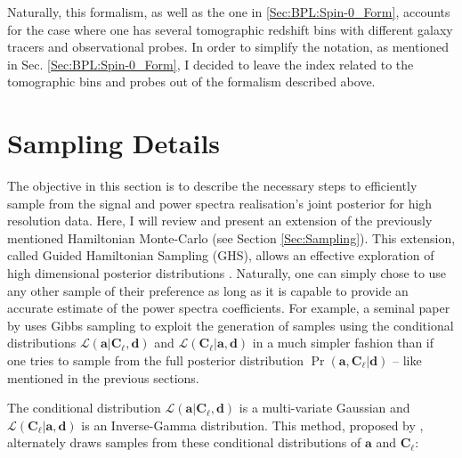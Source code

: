 \qquad Naturally, this formalism, as well as the one in \ref{Sec:BPL:Spin-0_Form}, accounts for the case where one has several tomographic redshift bins with different galaxy tracers and observational probes. In order to simplify the notation, as mentioned in Sec. \ref{Sec:BPL:Spin-0_Form}, I decided to leave the index related to the tomographic bins and probes out of the formalism described above.

\section{Sampling Details}\label{Sec:BPL:Sampling}
The objective in this section is to describe the necessary steps to efficiently sample from the signal and power spectra realisation's joint posterior for high resolution data. Here, I will review and present an extension of the previously mentioned Hamiltonian Monte-Carlo (see Section \ref{Sec:Sampling}). This extension, called Guided Hamiltonian Sampling (GHS), allows an effective exploration of high dimensional posterior distributions \citep{SreeThesis,2013-GuidedHamiltonian}. Naturally, one can simply chose to use any other sample of their preference as long as it is capable to provide an accurate estimate of the power spectra coefficients. For example, a seminal paper by \cite{Wandelt2004} uses Gibbs sampling \citep{Geman1984,Casella1992} to exploit the generation of samples using the conditional distributions $\mathcal{L}(\mathbf{a}|\textbf{C}_{\ell},\mathbf{d})$ and $\mathcal{L}(\textbf{C}_{\ell}|\mathbf{a},\mathbf{d})$ in a much simpler fashion than if one tries to sample from the full posterior distribution $\Pr(\mathbf{a},\textbf{C}_{\ell}|\mathbf{d})$ -- like mentioned in the previous sections.

\qquad The conditional distribution $\mathcal{L}(\mathbf{a}|\textbf{C}_{\ell},\mathbf{d})$ is a multi-variate Gaussian and $\mathcal{L}(\textbf{C}_{\ell}|\mathbf{a},\mathbf{d})$ is an Inverse-Gamma distribution. This method, proposed by \cite{Wandelt2004}, alternately draws samples from these conditional distributions of $\mathbf{a}$ and $\textbf{C}_{\ell}$:

